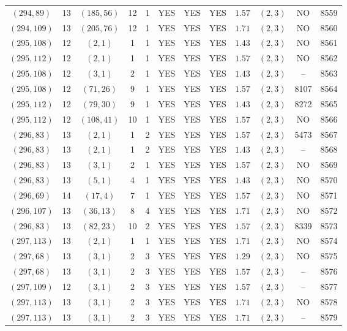 \begin{longtable}{|c|c|c|c|c|c|c|c|c|c|c|c|}
$(294,89)$ & 13 & $(185,56)$ & 12 & 1 & YES & YES & YES & $1.57$ & $(2,3)$ & NO & 8559\\
$(294,109)$ & 13 & $(205,76)$ & 12 & 1 & YES & YES & YES & $1.71$ & $(2,3)$ & NO & 8560\\
$(295,108)$ & 12 & $(2,1)$ & 1 & 1 & YES & YES & YES & $1.43$ & $(2,3)$ & NO & 8561\\
$(295,112)$ & 12 & $(2,1)$ & 1 & 1 & YES & YES & YES & $1.57$ & $(2,3)$ & NO & 8562\\
$(295,108)$ & 12 & $(3,1)$ & 2 & 1 & YES & YES & YES & $1.43$ & $(2,3)$ & -- & 8563\\
$(295,108)$ & 12 & $(71,26)$ & 9 & 1 & YES & YES & YES & $1.57$ & $(2,3)$ & 8107 & 8564\\
$(295,112)$ & 12 & $(79,30)$ & 9 & 1 & YES & YES & YES & $1.43$ & $(2,3)$ & 8272 & 8565\\
$(295,112)$ & 12 & $(108,41)$ & 10 & 1 & YES & YES & YES & $1.57$ & $(2,3)$ & NO & 8566\\
$(296,83)$ & 13 & $(2,1)$ & 1 & 2 & YES & YES & YES & $1.57$ & $(2,3)$ & 5473 & 8567\\
$(296,83)$ & 13 & $(2,1)$ & 1 & 2 & YES & YES & YES & $1.43$ & $(2,3)$ & -- & 8568\\
$(296,83)$ & 13 & $(3,1)$ & 2 & 1 & YES & YES & YES & $1.57$ & $(2,3)$ & NO & 8569\\
$(296,83)$ & 13 & $(5,1)$ & 4 & 1 & YES & YES & YES & $1.43$ & $(2,3)$ & NO & 8570\\
$(296,69)$ & 14 & $(17,4)$ & 7 & 1 & YES & YES & YES & $1.57$ & $(2,3)$ & NO & 8571\\
$(296,107)$ & 13 & $(36,13)$ & 8 & 4 & YES & YES & YES & $1.71$ & $(2,3)$ & NO & 8572\\
$(296,83)$ & 13 & $(82,23)$ & 10 & 2 & YES & YES & YES & $1.57$ & $(2,3)$ & 8339 & 8573\\
$(297,113)$ & 13 & $(2,1)$ & 1 & 1 & YES & YES & YES & $1.71$ & $(2,3)$ & NO & 8574\\
$(297,68)$ & 13 & $(3,1)$ & 2 & 3 & YES & YES & YES & $1.29$ & $(2,3)$ & NO & 8575\\
$(297,68)$ & 13 & $(3,1)$ & 2 & 3 & YES & YES & YES & $1.57$ & $(2,3)$ & -- & 8576\\
$(297,109)$ & 12 & $(3,1)$ & 2 & 3 & YES & YES & YES & $1.57$ & $(2,3)$ & -- & 8577\\
$(297,113)$ & 13 & $(3,1)$ & 2 & 3 & YES & YES & YES & $1.71$ & $(2,3)$ & NO & 8578\\
$(297,113)$ & 13 & $(3,1)$ & 2 & 3 & YES & YES & YES & $1.71$ & $(2,3)$ & -- & 8579\\

\end{longtable}
